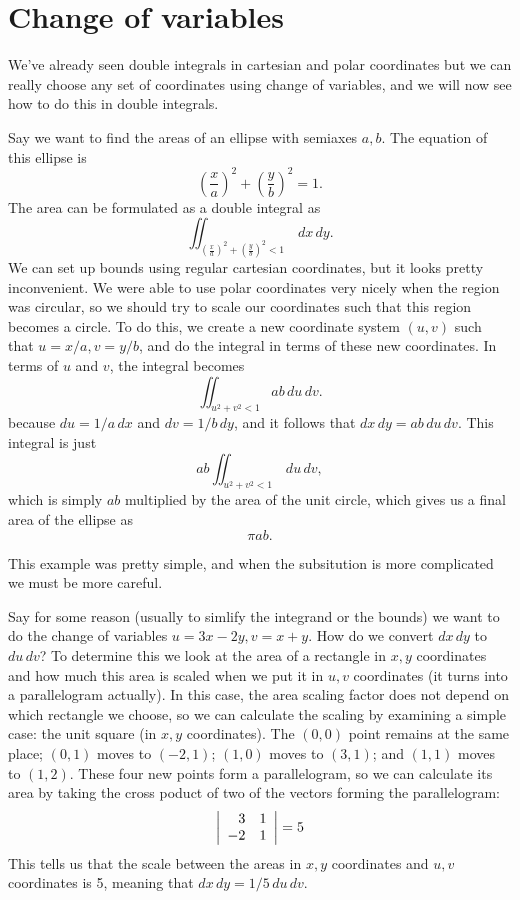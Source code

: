 \section{Change of variables}

We've already seen double integrals in cartesian and polar coordinates but we can really choose any set of coordinates using change of variables, and we will now see how to do this in double integrals.

\bex
Say we want to find the areas of an ellipse with semiaxes $a,b$. The equation of this ellipse is
\[ \left(\frac xa\right)^2 + \left(\frac yb\right)^2 = 1. \]
The area can be formulated as a double integral as 
\[ \iint_{\left(\frac xa\right)^2 + \left(\frac yb\right)^2 < 1} \,dx\,dy. \]
We can set up bounds using regular cartesian coordinates, but it looks pretty inconvenient. We were able to use polar coordinates very nicely when the region was circular, so we should try to scale our coordinates such that this region becomes a circle. To do this, we create a new coordinate system $(u,v)$ such that $u = x/a, v = y/b$, and do the integral in terms of these new coordinates. In terms of $u$ and $v$, the integral becomes
\[ \iint_{u^2+v^2<1} ab\,du\,dv. \]
because $du = 1/a\,dx$ and $dv=1/b\,dy$, and it follows that $dx\,dy=ab\,du\,dv$. This integral is just
\[ ab \iint_{u^2+v^2<1} \,du\,dv, \]
which is simply $ab$ multiplied by the area of the unit circle, which gives us a final area of the ellipse as 
\[ \pi a b. \]
\eex

This example was pretty simple, and when the subsitution is more complicated we must be more careful. 

\bex
Say for some reason (usually to simlify the integrand or the bounds) we want to do the change of variables $u=3x-2y,v=x+y$. How do we convert $dx\,dy$ to $du\,dv$? To determine this we look at the area of a rectangle in $x,y$ coordinates and how much this area is scaled when we put it in $u,v$ coordinates (it turns into a parallelogram actually). In this case, the area scaling factor does not depend on which rectangle we choose, so we can calculate the scaling by examining a simple case: the unit square (in $x,y$ coordinates). The $(0,0)$ point remains at the same place; $(0,1)$ moves to $(-2,1)$; $(1,0)$ moves to $(3,1)$; and $(1,1)$ moves to $(1,2)$. These four new points form a parallelogram, so we can calculate its area by taking the cross poduct of two of the vectors forming the parallelogram:
\[ \left| \begin{array}{rrrrrrrrrrrrrrrrrrrrrrrrr} 3  & 1       \\
        -2 & 1        \\ \end{array} \right| = 5 \]
This tells us that the scale between the areas in $x,y$ coordinates and $u,v$ coordinates is 5, meaning that $dx\,dy=1/5\,du\,dv$.

